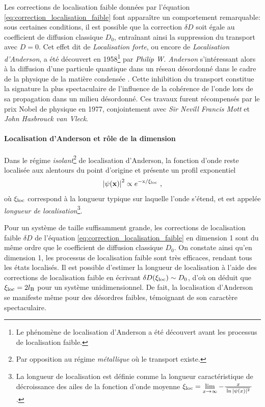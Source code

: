 Les corrections de localisation faible données par l'équation \ref{eq:correction_localisation_faible} font apparaître un comportement remarquable: sous certaines conditions, il est possible que la correction $\delta D$ soit égale au coefficient de diffusion classique $D_{\mathrm{0}}$, entraînant ainsi la suppression du transport avec $D=0$. Cet effet dit de \emph{Localisation forte}, ou encore de \emph{Localisation d'Anderson}, a été découvert en 1958\footnote{Le phénomène de localisation d'Anderson a été découvert avant les processus de localisation faible.} par \emph{Philip W. Anderson} s'intéressant alors à la diffusion d'une particule quantique dans un réseau désordonné dans le cadre de la physique de la matière condensée \citep{anderson1958absence}. Cette inhibition du transport constitue la signature la plus spectaculaire de l'influence de la cohérence de l'onde lors de sa propagation dans un milieu désordonné. Ces travaux furent récompensés par le prix Nobel de physique en 1977, conjointement avec \emph{Sir Nevill Francis Mott} et \emph{John Hasbrouck van Vleck}. 



\paragraph*{Localisation d'Anderson et rôle de la dimension}
Dans le régime \emph{isolant}\footnote{Par opposition au régime \emph{métallique} où le transport existe.} de localisation d'Anderson, la fonction d'onde reste localisée aux alentours du point d'origine et présente un profil exponentiel
\begin{equation}
\left| \psi (\mathbf{x}) \right|^2 \propto e^{-\mathrm{x}/\xi_{\mathrm{loc}}} \text{ ,}
\label{eq:exponentielle_anderson}
\end{equation}
où $\xi_{\mathrm{loc}}$ correspond à la longueur typique sur laquelle l'onde s'étend, et est appelée \emph{longueur de localisation}\footnote{La longueur de localisation est définie comme la longueur caractéristique de décroissance des ailes de la fonction d'onde moyenne $\xi_{\mathrm{loc}}=\lim\limits_{x\rightarrow\infty} -\frac{x}{\;\overline{\ln|\psi(x)|^2}\;}$.}.

Pour un système de taille suffisamment grande, les corrections de localisation faible $\delta D$ de l'équation \ref{eq:correction_localisation_faible} en dimension 1 sont du même ordre que le coefficient de diffusion classique $D_{\mathrm{0}}$. On constate ainsi qu'en dimension 1, les processus de localisation faible sont très efficaces, rendant tous les états localisés. Il est possible d'estimer la longueur de localisation à l'aide des corrections de localisation faible en écrivant $\delta D(\xi_{\mathrm{loc}})\sim D_{\mathrm{0}}$, d'où on déduit que $\xi_{\mathrm{loc}}=2 l_{\mathrm{B}}$ pour un système unidimensionnel. De fait, la localisation d'Anderson se manifeste même pour des désordres faibles, témoignant de son caractère spectaculaire. 



